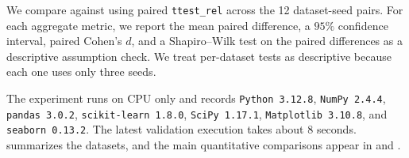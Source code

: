  We compare \ltwo against \baseline using paired \texttt{ttest\_rel} across the 12 dataset-seed pairs. For each aggregate metric, we report the mean paired difference, a $95\%$ confidence interval, paired Cohen's $d$, and a Shapiro--Wilk test on the paired differences as a descriptive assumption check. We treat per-dataset tests as descriptive because each one uses only three seeds.

 The experiment runs on CPU only and records \texttt{Python 3.12.8}, \texttt{NumPy 2.4.4}, \texttt{pandas 3.0.2}, \texttt{scikit-learn 1.8.0}, \texttt{SciPy 1.17.1}, \texttt{Matplotlib 3.10.8}, and \texttt{seaborn 0.13.2}. The latest validation execution takes about $8$ seconds.  summarizes the datasets, and the main quantitative comparisons appear in  and .


